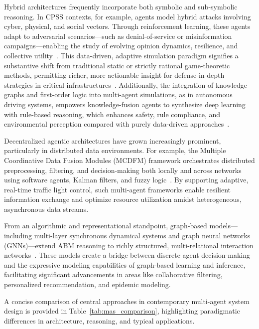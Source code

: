 Hybrid architectures frequently incorporate both symbolic and sub-symbolic reasoning. In CPSS contexts, for example, agents model hybrid attacks involving cyber, physical, and social vectors. Through reinforcement learning, these agents adapt to adversarial scenarios—such as denial-of-service or misinformation campaigns—enabling the study of evolving opinion dynamics, resilience, and collective utility~\cite{ref104}. This data-driven, adaptive simulation paradigm signifies a substantive shift from traditional static or strictly rational game-theoretic methods, permitting richer, more actionable insight for defense-in-depth strategies in critical infrastructures~\cite{ref104}. Additionally, the integration of knowledge graphs and first-order logic into multi-agent simulations, as in autonomous driving systems, empowers knowledge-fusion agents to synthesize deep learning with rule-based reasoning, which enhances safety, rule compliance, and environmental perception compared with purely data-driven approaches~\cite{ref112}.

Decentralized agentic architectures have grown increasingly prominent, particularly in distributed data environments. For example, the Multiple Coordinative Data Fusion Modules (MCDFM) framework orchestrates distributed preprocessing, filtering, and decision-making both locally and across networks using software agents, Kalman filters, and fuzzy logic~\cite{ref54}. By supporting adaptive, real-time traffic light control, such multi-agent frameworks enable resilient information exchange and optimize resource utilization amidst heterogeneous, asynchronous data streams.

From an algorithmic and representational standpoint, graph-based models—including multi-layer synchronous dynamical systems and graph neural networks (GNNs)—extend ABM reasoning to richly structured, multi-relational interaction networks~\cite{ref55,ref56,ref60}. These models create a bridge between discrete agent decision-making and the expressive modeling capabilities of graph-based learning and inference, facilitating significant advancements in areas like collaborative filtering, personalized recommendation, and epidemic modeling.

A concise comparison of central approaches in contemporary multi-agent system design is provided in Table~\ref{tab:mas_comparison}, highlighting paradigmatic differences in architecture, reasoning, and typical applications.


